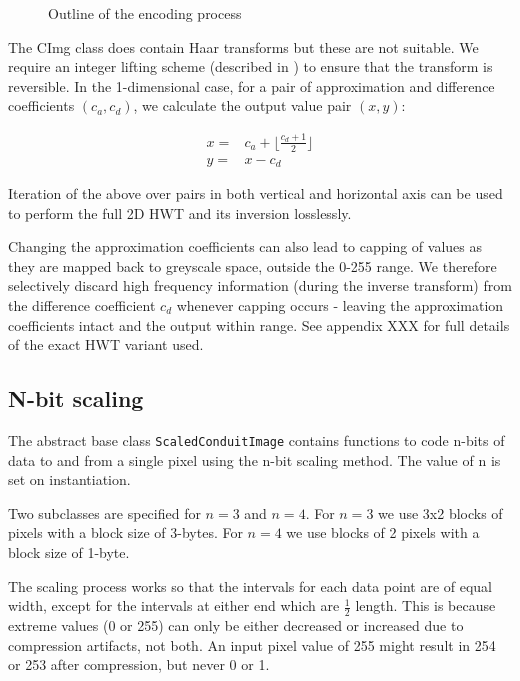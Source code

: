 \begin{figure}
\begin{center}

    
    
    \caption{Outline of the encoding process}
    \label{tikz:haar}
\end{center}
\end{figure}

The CImg class does contain Haar transforms but these are not suitable. We require an integer lifting scheme (described in \cite{haar}) to ensure that the transform is reversible. In the 1-dimensional case, for a pair of approximation and difference coefficients $(c_a,c_d)$, we calculate the output value pair $(x,y)$: 

\begin{eqnarray}
    x = & c_a + \lfloor \frac{c_d+1}{2} \rfloor \nonumber \\ 
    y = & x - c_d
\end{eqnarray}

Iteration of the above over pairs in both vertical and horizontal axis can be used to perform the full 2D HWT and its inversion losslessly.

Changing the approximation coefficients can also lead to capping of values as they are mapped back to greyscale space, outside the 0-255 range. We therefore selectively discard high frequency information (during the inverse transform) from the difference coefficient $c_d$ whenever capping occurs - leaving the approximation coefficients intact and the output within range. See appendix XXX for full details of the exact HWT variant used.



\FloatBarrier
\subsection{N-bit scaling}

The abstract base class {\tt ScaledConduitImage} contains functions to code n-bits of data to and from a single pixel using the n-bit scaling method. The value of n is set on instantiation.

Two subclasses are specified for $n=3$ and $n=4$. For $n=3$ we use 3x2 blocks of pixels with a block size of 3-bytes. For $n=4$ we use blocks of 2 pixels with a block size of 1-byte.

The scaling process works so that the intervals for each data point are of equal width, except for the intervals at either end which are $\frac{1}{2}$ length. This is because extreme values (0 or 255) can only be either decreased or increased due to compression artifacts, not both. An input pixel value of 255 might result in 254 or 253 after compression, but never 0 or 1.

